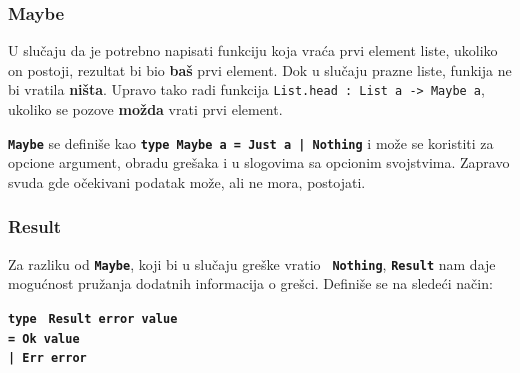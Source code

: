 \documentclass[12pt,oneside]{memoir}
\begin{document}
\subsubsection{Maybe}
U slučaju da je potrebno napisati funkciju koja vraća prvi element liste, ukoliko on
postoji, rezultat bi bio \textbf{baš} prvi element. Dok u slučaju prazne liste, funkija ne
bi vratila \textbf{ništa}. Upravo tako radi funkcija \texttt{List.head : List a -> Maybe a}, 
ukoliko se pozove \textbf{možda} vrati prvi element.

\texttt{\textbf{Maybe}} se definiše kao \texttt{\textbf{type Maybe a = Just a | Nothing}}
i može se koristiti za opcione argument, obradu grešaka i u slogovima sa opcionim svojstvima.
Zapravo svuda gde očekivani podatak može, ali ne mora, postojati.

\subsubsection{Result}
Za razliku od \texttt{\textbf{Maybe}}, koji bi u slučaju greške vratio \texttt{
\textbf{Nothing}}, \texttt{\textbf{Result}} nam daje mogućnost pružanja dodatnih 
informacija o grešci. Definiše se na sledeći način: \begin{tabbing}
\texttt{\textbf{type}} \= \texttt{\textbf{ Result error value}} \\
\> \=  \texttt{\textbf{= Ok value}} \\\>
\> \texttt{\textbf{| Err error }}
\end{tabbing}
\end{document}
